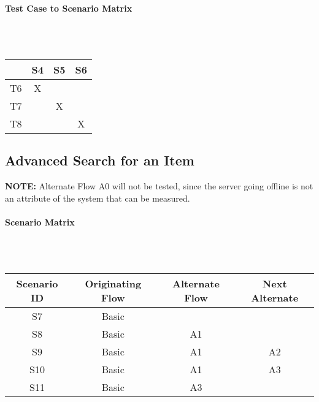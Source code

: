 \documentclass{article}
\begin{document}
\paragraph{Test Case to Scenario Matrix}~\\ \\
\begin{tabular}{ | c || c | c | c | }
\hline
   & S4 & S5 & S6 \\
\hline
\hline
T6 & X  &    &    \\
\hline
T7 &    & X  &    \\
\hline
T8 &    &    & X  \\
\hline
\end{tabular}


\subsection{Advanced Search for an Item}
\textbf{NOTE:} Alternate Flow A0 will not be tested, since the server going offline is not an attribute of the system that can be measured.

\paragraph{Scenario Matrix}~\\ \\
\begin{tabular}{ c  c  c  c }
\hline
Scenario ID & Originating Flow & Alternate Flow & Next Alternate \\
\hline
\hline
S7 & Basic &  & \\
\hline
S8 & Basic & A1 & \\
\hline
S9 & Basic & A1 & A2 \\
\hline
S10 & Basic & A1 & A3 \\
\hline
S11 & Basic & A3 &  \\
\hline
\end{tabular}\\
~\\
~\\
\end{document}
